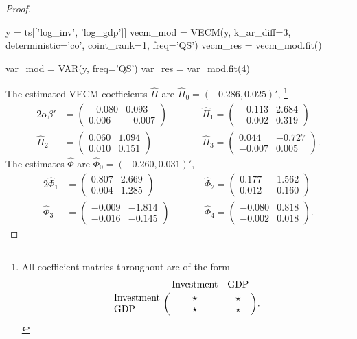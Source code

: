 \documentclass[oneside,reqno]{amsart}
\theoremstyle{definition}
\begin{document}
\begin{enumerate}[label=(\roman*)]
\begin{proof}
\begin{python3code}
y = ts[['log_inv', 'log_gdp']]
vecm_mod = VECM(y, k_ar_diff=3, deterministic='co', coint_rank=1, freq='QS')
vecm_res = vecm_mod.fit()

var_mod = VAR(y, freq='QS')
var_res = var_mod.fit(4)
\end{python3code}

The estimated VECM coefficients $\widehat \Pi$ are $\widehat\Pi_0 = (-0.286, 0.025)'$,
\footnote{All coefficient matries throughout are of the form 
\[
	\bordermatrix{~ & \text{Investment} & \text{GDP} \cr
                 \text{Investment} & \star & \star \cr
                  \text{GDP} & \star & \star \cr}.
\]}
\begin{alignat*}{2}
	\alpha\beta' &= \begin{pmatrix}
		-0.080 & 0.093 \\
		 0.006 & -0.007
	\end{pmatrix}  \qquad &&
	\widehat\Pi_1 = \begin{pmatrix}
		-0.113 & 2.684 \\
		-0.002 & 0.319
	\end{pmatrix} \\
	\widehat\Pi_2 &=\begin{pmatrix}
		0.060 & 1.094 \\
		0.010 & 0.151
	\end{pmatrix} \qquad &&
	\widehat\Pi_3 = \begin{pmatrix}
		0.044 & -0.727 \\
		-0.007 & 0.005
	\end{pmatrix}.
\end{alignat*}
The estimates $\widehat \Phi$ are $\widehat \Phi_0 = (-0.260,0.031)'$,
\begin{alignat*}{2}
	\widehat \Phi_1 &= \begin{pmatrix}
		0.807 & 2.669 \\
		 0.004 & 1.285
	\end{pmatrix} \qquad &&
	\widehat \Phi_2= \begin{pmatrix}
		0.177 & -1.562 \\
		0.012 & -0.160
		\end{pmatrix} \\
	\widehat \Phi_3 &= \begin{pmatrix}
		-0.009 & -1.814 \\
		-0.016 & -0.145 
	\end{pmatrix} \qquad&&
	\widehat \Phi_4  = \begin{pmatrix}
		-0.080 & 0.818 \\
		-0.002 & 0.018
	\end{pmatrix}.
\end{alignat*}
\end{proof}


\end{enumerate}
\end{document}
